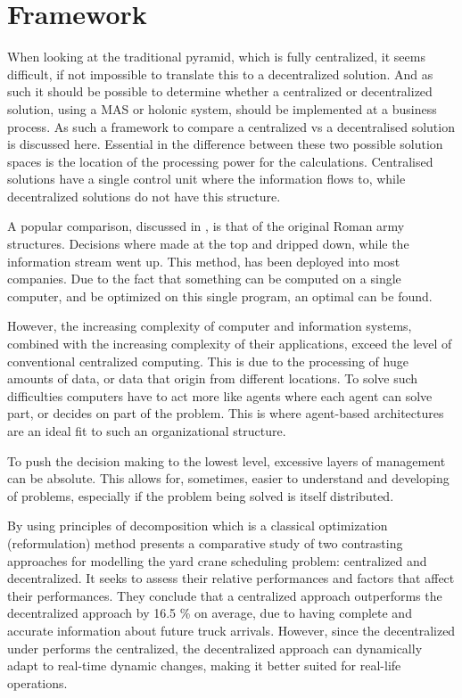 \section{Framework}
When looking at the traditional pyramid, which is fully centralized, it seems difficult, if not impossible to translate this to a decentralized solution. And as such it should be possible to determine whether a centralized or decentralized solution, using a MAS or holonic system, should be implemented at a business process. As such a framework to compare a centralized vs a decentralised solution is discussed here. Essential in the difference between these two possible solution spaces is the location of the processing power for the calculations. Centralised solutions have a single control unit where the information flows to, while decentralized solutions do not have this structure.

A popular comparison, discussed in \citet{parunak1999industrial}, is that of the original Roman army structures. Decisions where made at the top and dripped down, while the information stream went up. This method, has been deployed into most companies. Due to the fact that something can be computed on a single computer, and be optimized on this single program, an optimal can be found.

However, the increasing complexity of computer and information systems, combined with the increasing complexity of their applications, exceed the level of conventional centralized computing. This is due to the processing of huge amounts of data, or data that origin from different locations. To solve such difficulties computers have to act more like agents where each agent can solve part, or decides on part of the problem. This is where agent-based architectures are an ideal fit to such an organizational structure.

To push the decision making to the lowest level, excessive layers of management can be absolute. This allows for, sometimes, easier to understand and developing of problems, especially if the problem being solved is itself distributed.

By using principles of decomposition which is a classical optimization (reformulation) method \citet{sharif2012yard} presents a comparative study of two contrasting approaches for modelling the yard crane scheduling problem: centralized and decentralized. It seeks to assess their relative performances and factors that affect their performances. They conclude that a centralized approach outperforms the decentralized approach by 16.5 \% on average, due to having complete and accurate information about future truck arrivals. However, since the decentralized under performs the centralized, the decentralized approach can dynamically adapt to real-time dynamic changes, making it better suited for real-life operations. 

